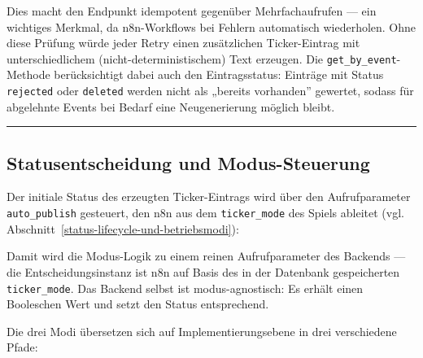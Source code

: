 Dies macht den Endpunkt idempotent gegenüber Mehrfachaufrufen --- ein
wichtiges Merkmal, da n8n-Workflows bei Fehlern automatisch wiederholen.
Ohne diese Prüfung würde jeder Retry einen zusätzlichen Ticker-Eintrag
mit unterschiedlichem (nicht-deterministischem) Text erzeugen. Die
\texttt{get\_by\_event}-Methode berücksichtigt dabei auch den
Eintragsstatus: Einträge mit Status \texttt{rejected} oder
\texttt{deleted} werden nicht als „bereits vorhanden'' gewertet,
sodass für abgelehnte Events bei Bedarf eine Neugenerierung möglich
bleibt.

\begin{center}\rule{0.5\linewidth}{0.5pt}\end{center}

\subsection{Statusentscheidung und
Modus-Steuerung}\label{statusentscheidung-und-modus-steuerung}

Der initiale Status des erzeugten Ticker-Eintrags wird über den
Aufrufparameter \texttt{auto\_publish} gesteuert, den n8n aus dem
\texttt{ticker\_mode} des Spiels ableitet (vgl. Abschnitt~\ref{status-lifecycle-und-betriebsmodi}):

\begin{Shaded}
\begin{Highlighting}[]
\OperatorTok{=}
\end{Highlighting}
\end{Shaded}

Damit wird die Modus-Logik zu einem reinen Aufrufparameter des Backends
--- die Entscheidungsinstanz ist n8n auf Basis des in der Datenbank
gespeicherten \texttt{ticker\_mode}. Das Backend selbst ist
modus-agnostisch: Es erhält einen Booleschen Wert und setzt den Status
entsprechend.

Die drei Modi übersetzen sich auf Implementierungsebene in drei
verschiedene Pfade:

